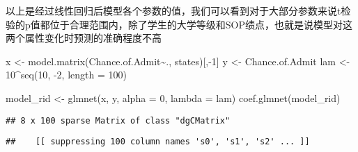 \documentclass[
]{article}
\newenvironment{Shaded}{\begin{snugshade}}{\end{snugshade}}
\newcommand{\AttributeTok}[1]{\textcolor[rgb]{0.77,0.63,0.00}{#1}}
\newcommand{\DecValTok}[1]{\textcolor[rgb]{0.00,0.00,0.81}{#1}}
\newcommand{\FunctionTok}[1]{\textcolor[rgb]{0.00,0.00,0.00}{#1}}
\newcommand{\NormalTok}[1]{#1}
\newcommand{\OtherTok}[1]{\textcolor[rgb]{0.56,0.35,0.01}{#1}}
\newcommand{\SpecialCharTok}[1]{\textcolor[rgb]{0.00,0.00,0.00}{#1}}
\begin{document}
以上是经过线性回归后模型各个参数的值，我们可以看到对于大部分参数来说t检验的p值都位于合理范围内，除了学生的大学等级和SOP绩点，也就是说模型对这两个属性变化时预测的准确程度不高

\begin{Shaded}
\begin{Highlighting}[]
\NormalTok{x }\OtherTok{\textless{}{-}} \FunctionTok{model.matrix}\NormalTok{(Chance.of.Admit}\SpecialCharTok{\textasciitilde{}}\NormalTok{., states)[,}\SpecialCharTok{{-}}\DecValTok{1}\NormalTok{]}
\NormalTok{y }\OtherTok{\textless{}{-}}\NormalTok{ Chance.of.Admit}
\NormalTok{lam }\OtherTok{\textless{}{-}} \DecValTok{10}\SpecialCharTok{\^{}}\FunctionTok{seq}\NormalTok{(}\DecValTok{10}\NormalTok{, }\SpecialCharTok{{-}}\DecValTok{2}\NormalTok{, }\AttributeTok{length =} \DecValTok{100}\NormalTok{)}

\NormalTok{model\_rid }\OtherTok{\textless{}{-}} \FunctionTok{glmnet}\NormalTok{(x, y, }\AttributeTok{alpha =} \DecValTok{0}\NormalTok{, }\AttributeTok{lambda =}\NormalTok{ lam)}
\FunctionTok{coef.glmnet}\NormalTok{(model\_rid)}
\end{Highlighting}
\end{Shaded}

\begin{verbatim}
## 8 x 100 sparse Matrix of class "dgCMatrix"
\end{verbatim}

\begin{verbatim}
##    [[ suppressing 100 column names 's0', 's1', 's2' ... ]]
\end{verbatim}
\end{document}
